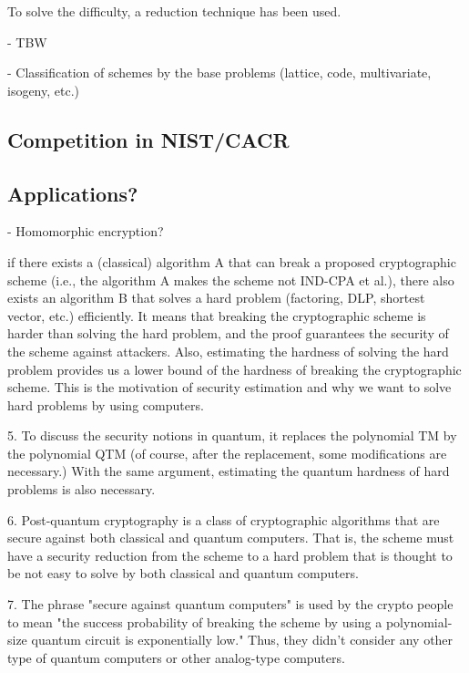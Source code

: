 To solve the difficulty, a reduction technique has been used.

 - TBW
 
 - Classification of schemes by the base problems (lattice, code, multivariate, isogeny, etc.)

\subsection{Competition in NIST/CACR}


\subsection{Applications?}

 - Homomorphic encryption?





if there exists a (classical) algorithm A that can break
a proposed cryptographic scheme (i.e., the algorithm A makes the scheme not IND-CPA et al.),
there also exists an algorithm B that solves a hard problem (factoring, DLP, shortest vector, etc.) efficiently.
It means that breaking the cryptographic scheme is harder than solving the hard problem, and the proof guarantees
the security of the scheme against attackers.
Also, estimating the hardness of solving the hard problem provides us a lower bound of the hardness of breaking the cryptographic scheme.
This is the motivation of security estimation and why we want to solve hard problems by using computers.

5. To discuss the security notions in quantum, it replaces the polynomial TM by the polynomial QTM  (of course, after the replacement, some modifications are necessary.)
With the same argument, estimating the quantum hardness of hard problems is also necessary.

6. Post-quantum cryptography is a class of cryptographic algorithms that are secure against both classical and quantum computers.
That is, the scheme must have a security reduction from the scheme to a hard problem that is thought to be not easy to solve by both classical and quantum computers.

7. The phrase "secure against quantum computers" is used by the crypto people to mean "the success probability of breaking the scheme by using
a polynomial-size quantum circuit is exponentially low."
Thus, they didn't consider any other type of quantum computers or other analog-type computers.


